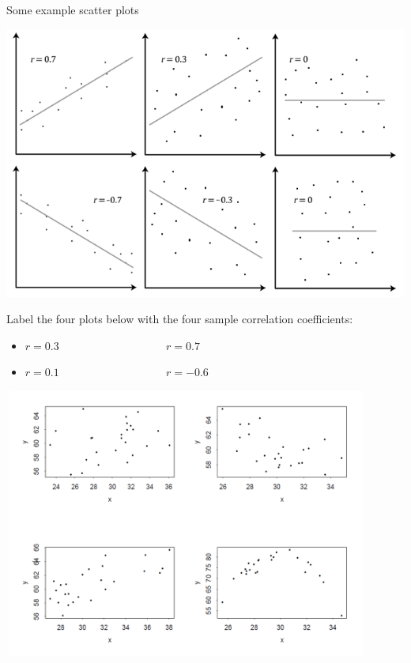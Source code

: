 ~\\~\\
Some example scatter plots\\
\begin{center}
\includegraphics[scale=0.5]{scatterexamples}
\end{center}

\newpage
{}
\noindent
Label the four plots below with the four sample correlation coefficients:
\begin{itemize}
\item $r=0.3$ ~~~~~~~~~~~~~~~~~~ $r=0.7$ 
\item $r=0.1$ ~~~~~~~~~~~~~~~~~~ $r=-0.6$ 
\end{itemize}
\begin{center}
\includegraphics[height=3.5in,width=4.75in]{scattermatch}
\end{center}

